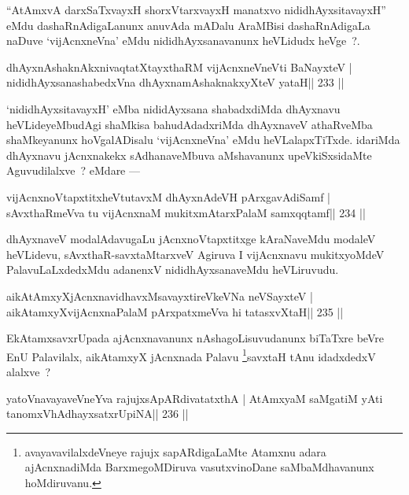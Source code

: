 \begin{artha}
``AtAmxvA darxSaTxvayxH shorxVtarxvayxH manatxvo nididhAyxsitavayxH'' eMdu dashaRnAdigaLanunx anuvAda mADalu AraMBisi dashaRnAdigaLa naDuve `vijAcnxneVna' eMdu nididhAyxsanavanunx heVLidudx heVge~?.
\end{artha}


\begin{shl}
dhAyxnAshaknAkxnivaqtatXtayxthaRM vijAcnxneVneVti BaNayxteV |
nididhAyxsanashabedxVna dhAyxnamAshaknakxyXteV yataH\hfill || 233 ||
\end{shl}

\begin{artha}
`nididhAyxsitavayxH' eMba nididAyxsana shabadxdiMda dhAyxnavu heVLideyeMbudAgi shaMkisa bahudAdadxriMda dhAyxnaveV athaRveMba shaMkeyanunx hoVgalADisalu `vijAcnxneVna' eMdu heVLalapxTiTxde. idariMda dhAyxnavu jAcnxnakekx sAdhanaveMbuva aMshavanunx upeVkiSxsidaMte Aguvudilalxve~? eMdare  {\rm ---} 
\end{artha}

\begin{shl}
vijAcnxnoVtapxtitxheVtutavxM dhAyxnAdeVH pArxgavAdiSamf |
sAvxthaRmeVva tu vijAcnxnaM mukitxmAtarxPalaM samxqqtamf\hfill || 234 ||
\end{shl}

\begin{artha}
dhAyxnaveV modalAdavugaLu jAcnxnoVtapxtitxge kAraNaveMdu modaleV heVLidevu, sAvxthaR-savxtaMtarxveV Agiruva I vijAcnxnavu mukitxyoMdeV PalavuLaLxdedxMdu adanenxV nididhAyxsanaveMdu heVLiruvudu.
\end{artha}


\begin{shl}
aikAtAmxyXjAcnxnavidhavxMsavayxtireVkeVNa neVSayxteV |
aikAtamxyXvijAcnxnaPalaM pArxpatxmeVva hi tatasxvXtaH\hfill || 235 ||
\end{shl}

\begin{artha}
EkAtamxsavxrUpada ajAcnxnavanunx nAshagoLisuvudanunx biTaTxre beVre EnU Palavilalx, aikAtamxyX jAcnxnada Palavu \footnote[1]{avayavavilalxdeVneye rajujx sapARdigaLaMte Atamxnu adara ajAcnxnadiMda BarxmegoMDiruva vasutxvinoDane saMbaMdhavanunx hoMdiruvanu.}savxtaH tAnu idadxdedxV alalxve~?
\end{artha}

\begin{shl}
yatoV\s navayaveVneYva rajujxsApARdivatatxthA |
AtAmx\s yaM saMgatiM yAti tanomxVhAdhayxsatxrUpiNA\hfill || 236 ||
\end{shl}

